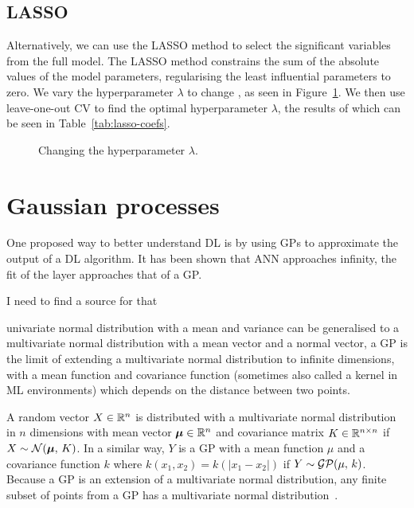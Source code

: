 \subsection{\acl{LASSO}}

Alternatively, we can use the \ac{LASSO} method to select the significant variables from the full model.
The \ac{LASSO} method constrains the sum of the absolute values of the model parameters, regularising the least influential parameters to zero.
We vary the hyperparameter \(\lambda\) to change , as seen in Figure~\ref{fig:lasso-lambda}.
We then use leave-one-out \ac{CV} to find the optimal hyperparameter \(\lambda\), the results of which can be seen in Table~\ref{tab:lasso-coefs}.

\begin{figure}[htbp]
	\centering
	
	\caption{Changing the hyperparameter \(\lambda\).}
	\label{fig:lasso-lambda}
\end{figure}


\section{Gaussian processes}

One proposed way to better understand \ac{DL} is by using \acp{GP} to approximate the output of a \ac{DL} algorithm.
It has been shown that  \acl{ANN} approaches infinity, the fit of the layer approaches that of a \ac{GP}.

\begin{todo}
I need to find a source for that
\end{todo}

 univariate normal distribution with a mean and variance can be generalised to a multivariate normal distribution with a mean vector and a normal vector, a \ac{GP} is the limit of extending a multivariate normal distribution to infinite dimensions, with a mean function and covariance function (sometimes also called a kernel in \ac{ML} environments) which depends on the distance between two points.

A random vector \(X \in \mathbb{R}{}^n\) is distributed with a multivariate normal distribution in \(n\) dimensions with mean vector \(\bm{\mu} \in \mathbb{R}{}^n\) and covariance matrix \(K \in \mathbb{R}^{n \times n}\) if \(X \sim \mathcal{N}(\bm{\mu},\, K)\).
In a similar way, \(Y\) is a \ac{GP} with a mean function \(\mu\) and a covariance function \(k\) where \(k(x_1, x_2) = k(\left|x_1 - x_2\right|)\) if \(Y \sim \mathcal{GP}(\mu,\, k)\).
Because a \ac{GP} is an extension of a multivariate normal distribution, any finite subset of points from a \ac{GP} has a multivariate normal distribution~\autocite[515]{williams1996}.

